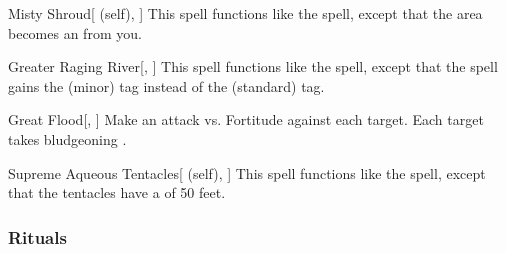 \lowercase{\hypertarget{spell:Misty Shroud}{}}\label{spell:Misty Shroud}
\begin{attuneability}[\nth{4}]{\hypertarget{spell:Misty Shroud}{Misty Shroud}}[ (self), ]
\targetrule
This spell functions like the  spell, except that the area becomes an  from you.
\end{attuneability}
\vspace{0.25em}



\lowercase{\hypertarget{spell:Greater Raging River}{}}\label{spell:Greater Raging River}
\begin{freeability}[\nth{5}]{\hypertarget{spell:Greater Raging River}{Greater Raging River}}[, ]
This spell functions like the  spell, except that the spell gains the  (minor) tag instead of the  (standard) tag.
\end{freeability}
\vspace{0.25em}



\lowercase{\hypertarget{spell:Great Flood}{}}\label{spell:Great Flood}
\begin{freeability}[\nth{6}]{\hypertarget{spell:Great Flood}{Great Flood}}[, ]
Make an attack vs. Fortitude against each target.
\hit Each target takes bludgeoning .
\end{freeability}
\vspace{0.25em}



\lowercase{\hypertarget{spell:Supreme Aqueous Tentacles}{}}\label{spell:Supreme Aqueous Tentacles}
\begin{attuneability}[\nth{6}]{\hypertarget{spell:Supreme Aqueous Tentacles}{Supreme Aqueous Tentacles}}[ (self), ]
This spell functions like the  spell, except that the tentacles have a  of 50 feet.
\end{attuneability}
\vspace{0.25em}



\subsubsection{Rituals}


